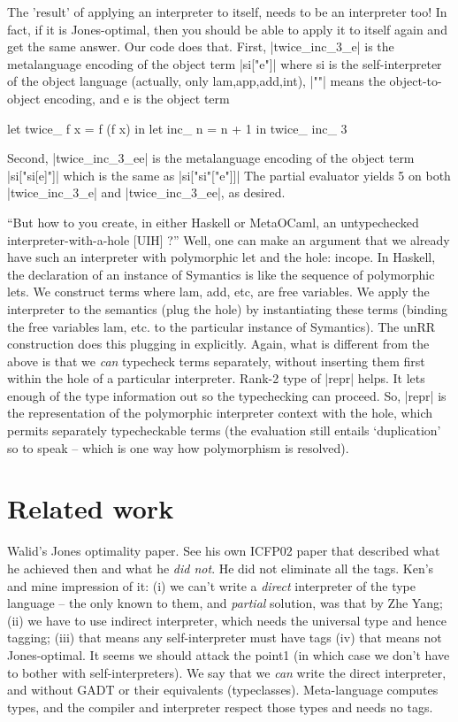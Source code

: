 \documentclass[preprint]{sigplanconf}
\begin{document}
The 'result' of applying an interpreter to itself, needs to be an 
interpreter too!  In fact, if it is Jones-optimal, then you should be 
able to apply it to itself again and get the same answer.  
Our code does that. First, |twice_inc_3_e| is the
metalanguage encoding of the object term |si["e"]|
where si is the self-interpreter of the object language (actually, only
lam,app,add,int), |""| means the object-to-object encoding, and e is the
object term
\begin{code}
  let twice_ f x = f (f x) in let inc_ n = n + 1 in twice_ inc_ 3
\end{code}

Second, |twice_inc_3_ee| is the metalanguage encoding of the object term
|si["si[e]"]|
which is the same as
|si["si"["e"]]|
The partial evaluator yields 5 on both |twice_inc_3_e| and 
|twice_inc_3_ee|,
as desired.


``But how 
to you create, in either Haskell or MetaOCaml, an untypechecked 
interpreter-with-a-hole [UIH] ?''
Well, one can make an argument that we already have such an
interpreter with polymorphic let and the hole: incope. In Haskell, the
declaration of an instance of Symantics is like the sequence of
polymorphic lets. We construct terms where lam, add, etc, are free
variables. We apply the interpreter to the semantics (plug the hole)
by instantiating these terms (binding the free variables lam, etc. to
the particular instance of Symantics). The unRR construction does
this plugging in explicitly.
Again, what is different from the above is that we \emph{can}
typecheck terms separately, without inserting them first within the
hole of a particular interpreter. Rank-2 type of |repr| helps. It lets
enough of the type information out so the typechecking can
proceed. So, |repr| is the representation of the polymorphic
interpreter context with the hole, which permits separately
typecheckable terms (the evaluation still entails `duplication' so to
speak -- which is one way how polymorphism is resolved).



\section{Related work}\label{related}
Walid's Jones optimality paper. See his own ICFP02 paper that
described what he achieved then and what he \emph{did not}. He did not
eliminate all the tags. Ken's and mine impression of it:
(i) we can't write a \emph{direct} interpreter of the type language
           -- the only known to them, and \emph{partial} solution, was 
              that by Zhe Yang;
(ii) we have to use indirect interpreter, which needs the universal
           type and hence tagging;
(iii) that means any self-interpreter must have tags
(iv) that means not Jones-optimal.
It seems we should attack the point1 (in which case we don't have to
bother with self-interpreters). We say that we \emph{can} write the direct
interpreter, and without GADT or their equivalents (typeclasses).
Meta-language computes types, and the compiler and interpreter respect
those types and needs no tags.
\end{document}
